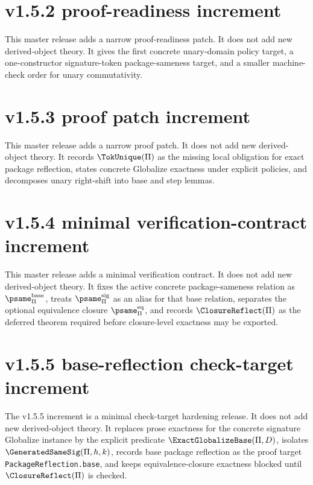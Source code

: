 \section*{v1.5.2 proof-readiness increment}
This master release adds a narrow proof-readiness patch. It does not add new derived-object theory. It gives the first concrete unary-domain policy target, a one-constructor signature-token package-sameness target, and a smaller machine-check order for unary commutativity.

\section*{v1.5.3 proof patch increment}
This master release adds a narrow proof patch. It does not add new derived-object theory. It records \(\TokUnique(\Pi)\) as the missing local obligation for exact package reflection, states concrete Globalize exactness under explicit policies, and decomposes unary right-shift into base and step lemmas.


\section*{v1.5.4 minimal verification-contract increment}
This master release adds a minimal verification contract. It does not add new derived-object theory. It fixes the active concrete package-sameness relation as \(\psame_{\Pi}^{\mathrm{base}}\), treats \(\psame_{\Pi}^{\mathrm{sig}}\) as an alias for that base relation, separates the optional equivalence closure \(\psame_{\Pi}^{\mathrm{eq}}\), and records \(\ClosureReflect(\Pi)\) as the deferred theorem required before closure-level exactness may be exported.


\section*{v1.5.5 base-reflection check-target increment}

The v1.5.5 increment is a minimal check-target hardening release. It does not add new derived-object theory. It replaces prose exactness for the concrete signature Globalize instance by the explicit predicate \(\ExactGlobalizeBase(\Pi,D)\), isolates \(\GeneratedSameSig(\Pi,h,k)\), records base package reflection as the proof target \texttt{PackageReflection.base}, and keeps equivalence-closure exactness blocked until \(\ClosureReflect(\Pi)\) is checked.

